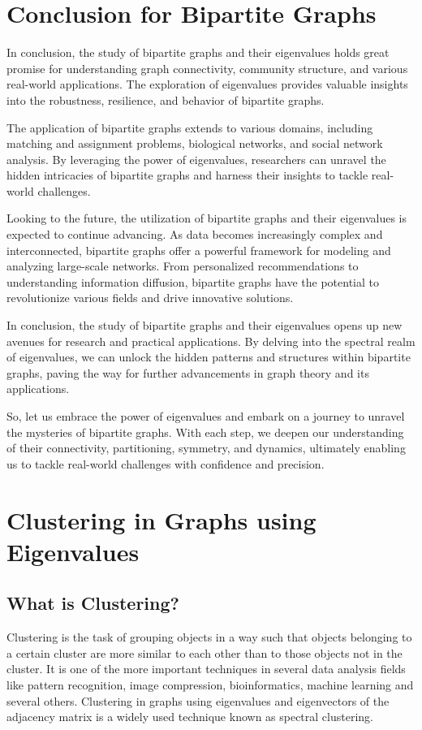 \documentclass{article}
\begin{document}
\section{Conclusion for Bipartite Graphs}
In conclusion, the study of bipartite graphs and their eigenvalues holds great promise for understanding graph connectivity, community structure, and various real-world applications. The exploration of eigenvalues provides valuable insights into the robustness, resilience, and behavior of bipartite graphs.

The application of bipartite graphs extends to various domains, including matching and assignment problems, biological networks, and social network analysis. By leveraging the power of eigenvalues, researchers can unravel the hidden intricacies of bipartite graphs and harness their insights to tackle real-world challenges.

Looking to the future, the utilization of bipartite graphs and their eigenvalues is expected to continue advancing. As data becomes increasingly complex and interconnected, bipartite graphs offer a powerful framework for modeling and analyzing large-scale networks. From personalized recommendations to understanding information diffusion, bipartite graphs have the potential to revolutionize various fields and drive innovative solutions.

In conclusion, the study of bipartite graphs and their eigenvalues opens up new avenues for research and practical applications. By delving into the spectral realm of eigenvalues, we can unlock the hidden patterns and structures within bipartite graphs, paving the way for further advancements in graph theory and its applications.

So, let us embrace the power of eigenvalues and embark on a journey to unravel the mysteries of bipartite graphs. With each step, we deepen our understanding of their connectivity, partitioning, symmetry, and dynamics, ultimately enabling us to tackle real-world challenges with confidence and precision.

\section{Clustering in Graphs using Eigenvalues}

    \subsection{What is Clustering?}
    Clustering is the task of grouping objects in a way such that objects belonging to a certain cluster are more similar to each other than to those objects not in the cluster. It is one of the more important techniques in several data analysis fields like pattern recognition, image compression,  bioinformatics, machine learning and several others. Clustering in graphs using eigenvalues and eigenvectors of the adjacency matrix is a widely used technique known as spectral clustering.
    
\end{document}
